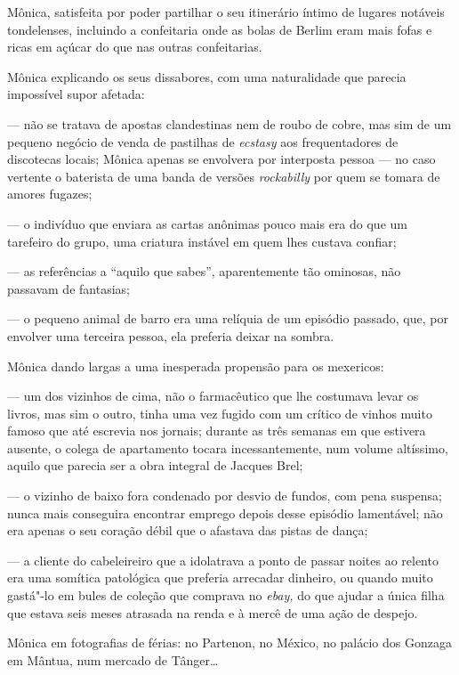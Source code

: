 Mônica, satisfeita por poder partilhar o seu itinerário íntimo de
lugares notáveis tondelenses, incluindo a confeitaria onde as bolas de
Berlim eram mais fofas e ricas em açúcar do que nas outras confeitarias.

Mônica explicando os seus dissabores, com uma naturalidade que parecia
impossível supor afetada:

--- não se tratava de apostas clandestinas nem de roubo de cobre, mas sim
  de um pequeno negócio de venda de pastilhas de \emph{ecstasy }aos
  frequentadores de discotecas locais; Mônica apenas se envolvera por
  interposta pessoa --- no caso vertente o baterista de uma banda de
  versões \emph{rockabilly }por quem se tomara de amores fugazes;

--- o indivíduo que enviara as cartas anônimas pouco mais era do que um
  tarefeiro do grupo, uma criatura instável em quem lhes custava
  confiar;

--- as referências a ``aquilo que sabes'', aparentemente tão ominosas, não
  passavam de fantasias;

--- o pequeno animal de barro era uma relíquia de um episódio passado,
  que, por envolver uma terceira pessoa, ela preferia deixar na sombra.


Mônica dando largas a uma inesperada propensão para os mexericos:

--- um dos vizinhos de cima, não o farmacêutico que lhe costumava levar os
  livros, mas sim o outro, tinha uma vez fugido com um crítico de
  vinhos muito famoso que até escrevia nos jornais; durante as três
  semanas em que estivera ausente, o colega de apartamento tocara
  incessantemente, num volume altíssimo, aquilo que parecia ser a obra
  integral de Jacques Brel;


--- o vizinho de baixo fora condenado por desvio de fundos, com pena
  suspensa; nunca mais conseguira encontrar emprego depois desse
  episódio lamentável; não era apenas o seu coração débil que o afastava
  das pistas de dança;

--- a cliente do cabeleireiro que a idolatrava a ponto de passar noites ao
  relento era uma somítica patológica que preferia arrecadar dinheiro,
  ou quando muito gastá"-lo em bules de coleção que comprava no
  \emph{ebay, }do que ajudar a única filha que estava seis meses
  atrasada na renda e à mercê de uma ação de despejo.


Mônica em fotografias de férias: no Partenon, no México, no palácio
dos Gonzaga em Mântua, num mercado de Tânger\ldots{}

